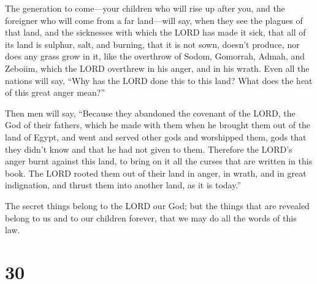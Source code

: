  The generation to come---your children who will rise up
after you, and the foreigner who will come from a far land---will say,
when they see the plagues of that land, and the sicknesses with which
the LORD has made it sick,  that all of its land is
sulphur, salt, and burning, that it is not sown, doesn't produce, nor
does any grass grow in it, like the overthrow of Sodom, Gomorrah, Admah,
and Zeboiim, which the LORD overthrew in his anger, and in his wrath.
 Even all the nations will say, ``Why has the LORD done
this to this land? What does the heat of this great anger mean?''

 Then men will say, ``Because they abandoned the covenant
of the LORD, the God of their fathers, which he made with them when he
brought them out of the land of Egypt,  and went and
served other gods and worshipped them, gods that they didn't know and
that he had not given to them.  Therefore the LORD's
anger burnt against this land, to bring on it all the curses that are
written in this book.  The LORD rooted them out of their
land in anger, in wrath, and in great indignation, and thrust them into
another land, as it is today.''

 The secret things belong to the LORD our God; but the
things that are revealed belong to us and to our children forever, that
we may do all the words of this law.

\hypertarget{section-29}{%
\section{30}\label{section-29}}

